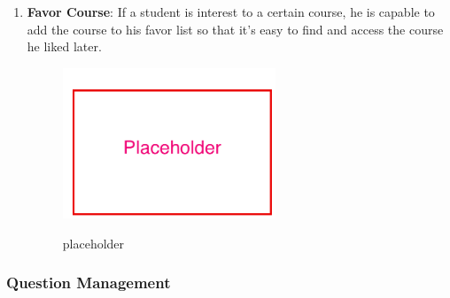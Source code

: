 \begin{enumerate}
\item
\textbf{Favor Course}: If a student is interest to a certain course, he is capable to add the course to his favor list so that it's easy to find and access the course he liked later.

\begin{figure}[!htbp]
  \caption{placeholder}
  \centering
    \includegraphics[width=0.6\textwidth]{Figures/placeholder.png}
  \label{fig:placeholder}
\end{figure}

\end{enumerate}

\subsubsection{Question Management}

